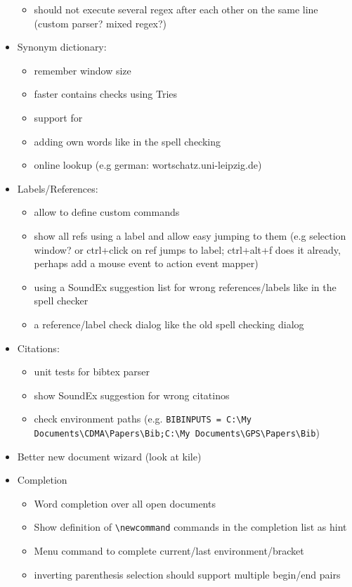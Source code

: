 \documentclass[10pt,a4paper,landscape]{report}
\begin{document}
\begin{itemize}
\begin{itemize}
		\item should not execute several regex after each other on the same line (custom parser? mixed regex?)	
	\end{itemize}
	\item Synonym dictionary: \begin{itemize}
		\item remember window size
		\item faster contains checks using Tries
		\item support for 
		\item adding own words like in the spell checking 
		\item online lookup (e.g german: wortschatz.uni-leipzig.de)
	\end{itemize}
	\item Labels/References: \begin{itemize}
		\item allow to define custom commands
		\item 	show all refs using a label and allow easy jumping to them (e.g selection window? or ctrl+click on ref jumps to label; ctrl+alt+f does it already, perhaps add a mouse event to action event mapper)
		\item using a SoundEx suggestion list for wrong references/labels like in the spell checker
		\item a reference/label check dialog like the old spell checking dialog
	\end{itemize}
	\item Citations: \begin{itemize}
		\item unit tests for bibtex parser
		\item show SoundEx suggestion for wrong citatinos
		\item check environment paths (e.g. \verb+BIBINPUTS = C:\My Documents\CDMA\Papers\Bib;C:\My Documents\GPS\Papers\Bib+)
	\end{itemize}
	\item Better new document wizard (look at kile)
	\item Completion \begin{itemize}
	\item Word completion over all open documents
	\item Show definition of \verb+\newcommand+ commands in the completion list as hint
	\item  Menu command to complete current/last environment/bracket
	\item inverting parenthesis selection should support multiple begin/end pairs

\end{itemize}
\end{itemize}
\end{document}
